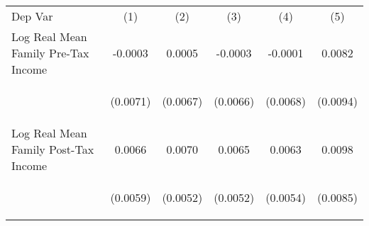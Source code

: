 \begin{center}
\begin{tabular}{lccccc}
\hline \noalign{\smallskip}Dep Var & (1) & (2) & (3) & (4) & (5)\\
\noalign{\smallskip}\hline \noalign{\smallskip}Log Real Mean Family Pre-Tax Income & \begin{scriptsize}-0.0003\end{scriptsize} & \begin{scriptsize}0.0005\end{scriptsize} & \begin{scriptsize}-0.0003\end{scriptsize} & \begin{scriptsize}-0.0001\end{scriptsize} & \begin{scriptsize}0.0082\end{scriptsize}\\
 & \begin{scriptsize}(0.0071)\end{scriptsize} & \begin{scriptsize}(0.0067)\end{scriptsize} & \begin{scriptsize}(0.0066)\end{scriptsize} & \begin{scriptsize}(0.0068)\end{scriptsize} & \begin{scriptsize}(0.0094)\end{scriptsize}\\
\noalign{\smallskip}Log Real Mean Family Post-Tax Income & \begin{scriptsize}0.0066\end{scriptsize} & \begin{scriptsize}0.0070\end{scriptsize} & \begin{scriptsize}0.0065\end{scriptsize} & \begin{scriptsize}0.0063\end{scriptsize} & \begin{scriptsize}0.0098\end{scriptsize}\\
 & \begin{scriptsize}(0.0059)\end{scriptsize} & \begin{scriptsize}(0.0052)\end{scriptsize} & \begin{scriptsize}(0.0052)\end{scriptsize} & \begin{scriptsize}(0.0054)\end{scriptsize} & \begin{scriptsize}(0.0085)\end{scriptsize}\\

\end{tabular}
\end{center}
